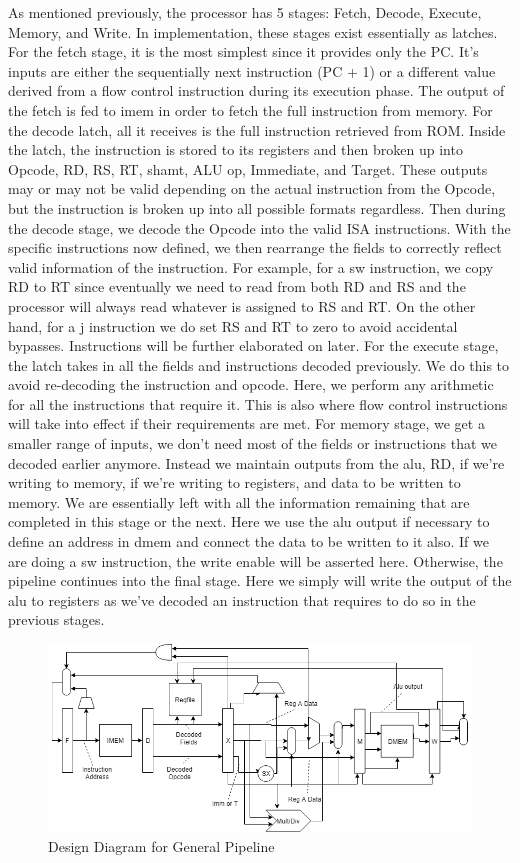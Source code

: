 \documentclass[letterpaper]{article} %
\begin{document}
As mentioned previously, the processor has 5 stages: Fetch, Decode, Execute, Memory, and Write. In implementation, these stages exist essentially as latches. For the fetch stage, it is the most simplest since it provides only the PC. It's inputs are either the sequentially next instruction (PC + 1) or a different value derived from a flow control instruction during its execution phase. The output of the fetch is fed to imem in order to fetch the full instruction from memory. For the decode latch, all it receives is the full instruction retrieved from ROM. Inside the latch, the instruction is stored to its registers and then broken up into Opcode, RD, RS, RT, shamt, ALU op, Immediate, and Target. These outputs may or may not be valid depending on the actual instruction from the Opcode, but the instruction is broken up into all possible formats regardless. Then during the decode stage, we decode the Opcode into the valid ISA instructions. With the specific instructions now defined, we then rearrange the fields to correctly reflect valid information of the instruction. For example, for a sw instruction, we copy RD to RT since eventually we need to read from both RD and RS and the processor will always read whatever is assigned to RS and RT. On the other hand, for a j instruction we do set RS and RT to zero to avoid accidental bypasses. Instructions will be further elaborated on later. For the execute stage, the latch takes in all the fields and instructions decoded previously. We do this to avoid re-decoding the instruction and opcode. Here, we perform any arithmetic for all the instructions that require it. This is also where flow control instructions will take into effect if their requirements are met. For memory stage, we get a smaller range of inputs, we don't need most of the fields or instructions that we decoded earlier anymore. Instead we maintain outputs from the alu, RD, if we're writing to memory, if we're writing to registers, and data to be written to memory. We are essentially left with all the information remaining that are completed in this stage or the next. Here we use the alu output if necessary to define an address in dmem and connect the data to be written to it also. If we are doing a sw instruction, the write enable will be asserted here. Otherwise, the pipeline continues into the final stage. Here we simply will write the output of the alu to registers as we've decoded an instruction that requires to do so in the previous stages.

\begin{figure}[htb!]
    \centering
    \includegraphics[width=.7\textwidth]{stageDiagram.png}
    \caption{Design Diagram for General Pipeline}
\end{figure}
\end{document}
